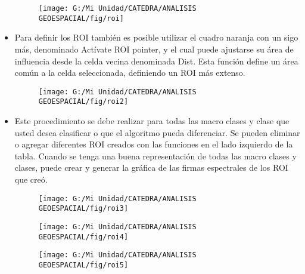 \documentclass[a4paper,oneside,11pt,]{article}
\begin{document}
\begin{itemize}
\begin{figure}
\centering
\texttt{[image: G:/Mi Unidad/CATEDRA/ANALISIS GEOESPACIAL/fig/roi]}
\end{figure}

\item Para definir los ROI también es posible utilizar el cuadro naranja con un sigo más, denominado Actívate ROI pointer, y el cual puede ajustarse su área de influencia desde la celda vecina denominada Dist. Esta función define un área común a la celda seleccionada, definiendo un ROI más extenso. 

\begin{figure}
\centering
\texttt{[image: G:/Mi Unidad/CATEDRA/ANALISIS GEOESPACIAL/fig/roi2]}
\end{figure}

\item Este procedimiento se debe realizar para todas las macro clases y clase que usted desea clasificar o que el algoritmo pueda diferenciar. Se pueden eliminar o agregar diferentes ROI creados con las funciones en el lado izquierdo de la tabla. Cuando se tenga una buena representación de todas las macro clases y clases, puede crear y generar la gráfica de las firmas espectrales de los ROI que creó.

\begin{figure}
\centering
\texttt{[image: G:/Mi Unidad/CATEDRA/ANALISIS GEOESPACIAL/fig/roi3]}
\end{figure}

\begin{figure}
\centering
\texttt{[image: G:/Mi Unidad/CATEDRA/ANALISIS GEOESPACIAL/fig/roi4]}
\end{figure}

\begin{figure}
\centering
\texttt{[image: G:/Mi Unidad/CATEDRA/ANALISIS GEOESPACIAL/fig/roi5]}
\end{figure}


\end{itemize}
\end{document}
